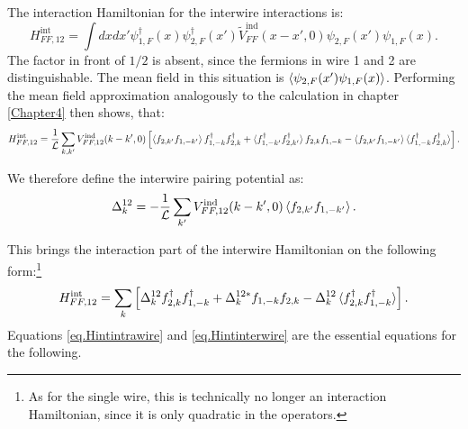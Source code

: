 The interaction Hamiltonian for the interwire interactions is:
\begin{equation}
H^\text{int}_{FF,12} = \int dx dx' \psi^\dagger_{1,F}(x)\psi^\dagger_{2,F}(x') \tilde{V}^\text{ind}_{FF}(x-x',0) \psi_{2,F}(x')\psi_{1,F}(x).
\end{equation}
The factor in front of $1/2$ is absent, since the fermions in wire 1 and 2 are distinguishable. The mean field in this situation is $\braket{\psi_{2,F}(x')\psi_{1,F}(x)}$. Performing the mean field approximation analogously to the calculation in chapter \ref{Chapter4} then shows, that:
\begin{equation}
H^\text{int}_{FF,12} = \frac{1}{\mathcal{L}} \sum_{k,k'} V^\text{ind}_{FF,12}(k-k',0)\left[\braket{f_{2,k'}f_{1,-k'}}f^\dagger_{1,-k}f^\dagger_{2,k} + \braket{f^\dagger_{1,-k'}f^\dagger_{2,k'}}f_{2,k}f_{1,-k} - \braket{f_{2,k'}f_{1,-k'}}\braket{f^\dagger_{1,-k}f^\dagger_{2,k}} \right].
\end{equation}

We therefore define the interwire pairing potential as:
\begin{equation}
\Delta^{12}_k = -\frac{1}{\mathcal{L}} \sum_{k'} V^\text{ind}_{FF,12}(k-k',0)\braket{f_{2,k'}f_{1,-k'}}.
\end{equation}

This brings the interaction part of the interwire Hamiltonian on the following form:\footnote{As for the single wire, this is technically no longer an interaction Hamiltonian, since it is only quadratic in the operators.}
\begin{equation}
H^\text{int}_{FF,12} = \sum_{k} \left[\Delta^{12}_k f^\dagger_{2,k}f^\dagger_{1,-k} + \Delta^{12 *}_k f_{1,-k}f_{2,k} - \Delta^{12}_k\braket{f^\dagger_{2,k}f^\dagger_{1,-k}} \right].
\label{eq.Hintinterwire}
\end{equation}
Equations \ref{eq.Hintintrawire} and \ref{eq.Hintinterwire} are the essential equations for the following. 

